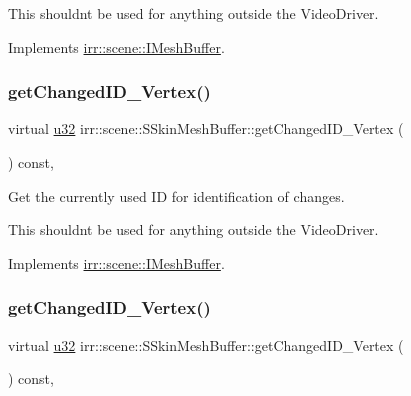 This shouldn\textquotesingle{}t be used for anything outside the Video\+Driver. 

Implements \hyperlink{classirr_1_1scene_1_1IMeshBuffer_acc389d76856dfb06c3ba45a92315e6d8}{irr\+::scene\+::\+I\+Mesh\+Buffer}.

\mbox{\label{structirr_1_1scene_1_1SSkinMeshBuffer_a94faa430425d73fbb6cab74ac65af1c1}} 
\subsubsection{\texorpdfstring{get\+Changed\+I\+D\+\_\+\+Vertex()}{getChangedID\_Vertex()}\hspace{0.1cm}{\footnotesize\ttfamily [1/2]}}
{\footnotesize\ttfamily virtual \hyperlink{namespaceirr_a0416a53257075833e7002efd0a18e804}{u32} irr\+::scene\+::\+S\+Skin\+Mesh\+Buffer\+::get\+Changed\+I\+D\+\_\+\+Vertex (\begin{DoxyParamCaption}{ }\end{DoxyParamCaption}) const\hspace{0.3cm}{\ttfamily [inline]}, {\ttfamily [virtual]}}



Get the currently used ID for identification of changes. 

This shouldn\textquotesingle{}t be used for anything outside the Video\+Driver. 

Implements \hyperlink{classirr_1_1scene_1_1IMeshBuffer_aba48df31edf92a0117692c0be02298db}{irr\+::scene\+::\+I\+Mesh\+Buffer}.

\mbox{\label{structirr_1_1scene_1_1SSkinMeshBuffer_a94faa430425d73fbb6cab74ac65af1c1}} 
\subsubsection{\texorpdfstring{get\+Changed\+I\+D\+\_\+\+Vertex()}{getChangedID\_Vertex()}\hspace{0.1cm}{\footnotesize\ttfamily [2/2]}}
{\footnotesize\ttfamily virtual \hyperlink{namespaceirr_a0416a53257075833e7002efd0a18e804}{u32} irr\+::scene\+::\+S\+Skin\+Mesh\+Buffer\+::get\+Changed\+I\+D\+\_\+\+Vertex (\begin{DoxyParamCaption}{ }\end{DoxyParamCaption}) const\hspace{0.3cm}{\ttfamily [inline]}, {\ttfamily [virtual]}}



